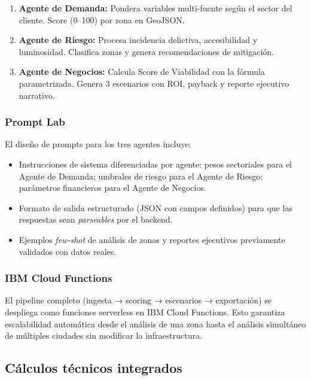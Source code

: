 \documentclass[12pt,a4paper]{article}
\begin{document}
\begin{enumerate}[leftmargin=1.5cm, itemsep=4pt]
  \item \textbf{Agente de Demanda:} Pondera variables multi-fuente según el sector del cliente. Score (0–100) por zona en GeoJSON.
  \item \textbf{Agente de Riesgo:} Procesa incidencia delictiva, accesibilidad y luminosidad. Clasifica zonas y genera recomendaciones de mitigación.
  \item \textbf{Agente de Negocios:} Calcula Score de Viabilidad con la fórmula parametrizada. Genera 3 escenarios con ROI, payback y reporte ejecutivo narrativo.
\end{enumerate}

\subsubsection{Prompt Lab}

El diseño de prompts para los tres agentes incluye:

\begin{itemize}[leftmargin=1.5cm, itemsep=3pt]
  \item Instrucciones de sistema diferenciadas por agente: pesos sectoriales para el Agente de Demanda; umbrales de riesgo para el Agente de Riesgo; parámetros financieros para el Agente de Negocios.
  \item Formato de salida estructurado (JSON con campos definidos) para que las respuestas sean \textit{parseables} por el backend.
  \item Ejemplos \textit{few-shot} de análisis de zonas y reportes ejecutivos previamente validados con datos reales.
\end{itemize}

\subsubsection{IBM Cloud Functions}

El pipeline completo (ingesta → scoring → escenarios → exportación) se despliega como funciones serverless en IBM Cloud Functions. Esto garantiza escalabilidad automática desde el análisis de una zona hasta el análisis simultáneo de múltiples ciudades sin modificar la infraestructura.

\subsection{Cálculos técnicos integrados}
\end{document}
